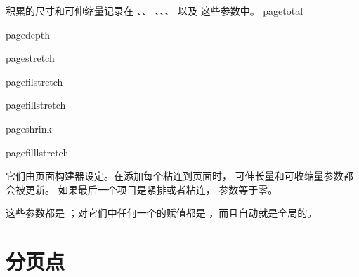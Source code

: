 \documentclass{book}
\begin{document}
积累的尺寸和可伸缩量记录在 、、
、、、
 以及 这些参数中。
\cstoidx pagetotal\par\cstoidx pagedepth\par
\cstoidx pagestretch\par\cstoidx pagefilstretch\par
\cstoidx pagefillstretch\par
\cstoidx pageshrink\par\cstoidx pagefilllstretch\par
它们由页面构建器设定。在添加每个粘连到页面时，
可伸长量和可收缩量参数都会被更新。
如果最后一个项目是紧排或者粘连， 参数等于零。

这些参数都是 ；对它们中任何一个的赋值都是
，而且自动就是全局的。


\section{分页点}

\end{document}
